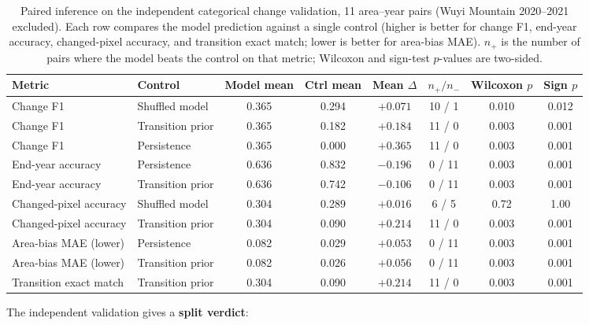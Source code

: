 \documentclass{article}
\begin{document}
\begin{table}[htbp]
\centering
\caption{Paired inference on the independent categorical change validation, 11 area--year pairs (Wuyi Mountain 2020--2021 excluded). Each row compares the model prediction against a single control (higher is better for change F1, end-year accuracy, changed-pixel accuracy, and transition exact match; lower is better for area-bias MAE). $n_+$ is the number of pairs where the model beats the control on that metric; Wilcoxon and sign-test $p$-values are two-sided.}
\label{tab:independent_change_paired}
\footnotesize
\setlength{\tabcolsep}{3pt}
\begin{tabular*}{\textwidth}{@{\extracolsep{\fill}}llcccccc@{}}
\toprule
Metric & Control & Model mean & Ctrl mean & Mean $\Delta$ & $n_+/n_-$ & Wilcoxon $p$ & Sign $p$ \\
\midrule
Change F1               & Shuffled model      & 0.365 & 0.294 & $+0.071$ & 10 / 1 & 0.010 & 0.012 \\
Change F1               & Transition prior    & 0.365 & 0.182 & $+0.184$ & 11 / 0 & 0.003 & 0.001 \\
Change F1               & Persistence         & 0.365 & 0.000 & $+0.365$ & 11 / 0 & 0.003 & 0.001 \\
End-year accuracy       & Persistence         & 0.636 & 0.832 & $-0.196$ & 0 / 11 & 0.003 & 0.001 \\
End-year accuracy       & Transition prior    & 0.636 & 0.742 & $-0.106$ & 0 / 11 & 0.003 & 0.001 \\
Changed-pixel accuracy  & Shuffled model      & 0.304 & 0.289 & $+0.016$ & 6 / 5 & 0.72 & 1.00 \\
Changed-pixel accuracy  & Transition prior    & 0.304 & 0.090 & $+0.214$ & 11 / 0 & 0.003 & 0.001 \\
Area-bias MAE (lower)   & Persistence         & 0.082 & 0.029 & $+0.053$ & 0 / 11 & 0.003 & 0.001 \\
Area-bias MAE (lower)   & Transition prior    & 0.082 & 0.026 & $+0.056$ & 0 / 11 & 0.003 & 0.001 \\
Transition exact match  & Transition prior    & 0.304 & 0.090 & $+0.214$ & 11 / 0 & 0.003 & 0.001 \\
\bottomrule
\end{tabular*}
\end{table}

The independent validation gives a \textbf{split verdict}:
\end{document}

